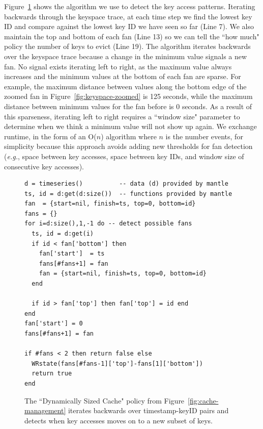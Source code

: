 Figure~\ref{src:dyn-cache} shows the algorithm we use to detect the key access
patterns. Iterating backwards through the keyspace trace, at each time step we
find the lowest key ID and compare against the lowest key ID we have seen so
far (Line 7). We also maintain the top and bottom of each fan (Line 13) so we
can tell the ``how much" policy the number of keys to evict (Line 19).  The
algorithm iterates backwards over the keyspace trace because a change in the
minimum value signals a new fan. No signal exists iterating left to right, as
the maximum value always increases and the minimum values at the bottom of each
fan are sparse.  For example, the maximum distance between values along the
bottom edge of the zoomed fan in Figure~\ref{fig:keyspace-zoomed} is 125
seconds, while the maximum distance between minimum values for the fan before
is 0 seconds. As a result of this sparseness, iterating left to right requires
a ``window size" parameter to determine when we think a minimum value will not
show up again.  We exchange runtime, in the form of an O(\(n\)) algorithm where
\(n\) is the number events, for simplicity because this approach avoids adding
new thresholds for fan detection ({\it e.g.}, space between key accesses, space
between key IDs, and window size of consecutive key accesses).


\begin{figure}[h]
\footnotesize
\begin{verbatim}
d = timeseries()          -- data (d) provided by mantle
ts, id = d:get(d:size())  -- functions provided by mantle
fan  = {start=nil, finish=ts, top=0, bottom=id}
fans = {}
for i=d:size(),1,-1 do -- detect possible fans
  ts, id = d:get(i)
  if id < fan['bottom'] then
    fan['start']  = ts
    fans[#fans+1] = fan 
    fan = {start=nil, finish=ts, top=0, bottom=id}
  end 

  if id > fan['top'] then fan['top'] = id end 
end
fan['start'] = 0 
fans[#fans+1] = fan 

if #fans < 2 then return false else
  WRstate(fans[#fans-1]['top']-fans[1]['bottom'])
  return true
end
\end{verbatim}
\caption{The ``Dynamically Sized Cache" policy from
Figure~\ref{fig:cache-management} iterates backwards over timestamp-keyID pairs
and detects when key accesses moves on to a new subset of
keys.\label{src:dyn-cache}}
\end{figure}
